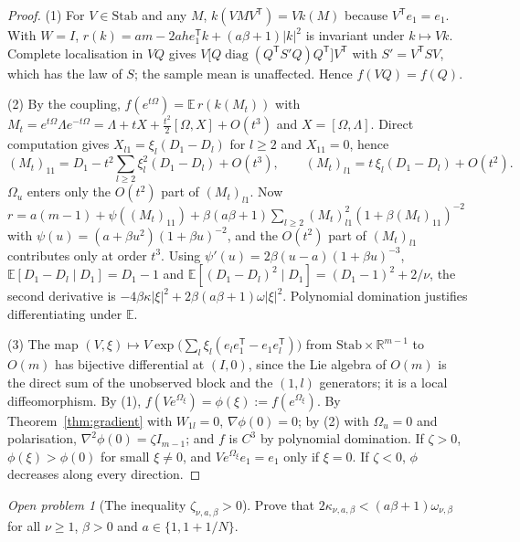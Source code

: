 \documentclass[11pt,a4paper]{article}
\numberwithin{equation}{section}
\theoremstyle{remark}\newtheorem{remark}[theorem]{Remark}
\newtheorem{openproblem}[theorem]{Open problem}
\newcommand{\E}{\mathbb E}
\newcommand{\R}{\mathbb R}
\newcommand{\diag}{\operatorname{diag}}
\newcommand{\T}{^{\mathsf T}}
\begin{document}
\begin{proof}
(1) For \(V\in\mathrm{Stab}\) and any \(M\), \(k(VMV\T)=Vk(M)\) because \(V\T e_1=e_1\). With \(W=I\),
\(r(k)=am-2ahe_1\T k+(a\beta+1)|k|^2\) is invariant under \(k\mapsto Vk\). Complete localisation in
\(VQ\) gives \(V\bigl[Q\diag(Q\T S'Q)Q\T\bigr]V\T\) with \(S'=V\T SV\), which has the law of \(S\); the
sample mean is unaffected. Hence \(f(VQ)=f(Q)\).

(2) By the coupling, \(f(e^{t\Omega})=\E\,r(k(M_t))\) with
\(M_t=e^{t\Omega}\Lambda e^{-t\Omega}=\Lambda+tX+\frac{t^2}2[\Omega,X]+O(t^3)\) and
\(X=[\Omega,\Lambda]\). Direct computation gives \(X_{l1}=\xi_l(D_1-D_l)\) for \(l\ge2\) and
\(X_{11}=0\), hence
\[
 (M_t)_{11}=D_1-t^2\sum_{l\ge2}\xi_l^2(D_1-D_l)+O(t^3),\qquad
 (M_t)_{l1}=t\,\xi_l(D_1-D_l)+O(t^2).
\]
\(\Omega_u\) enters only the \(O(t^2)\) part of \((M_t)_{l1}\). Now
\(r=a(m-1)+\psi((M_t)_{11})+\beta(a\beta+1)\sum_{l\ge2}(M_t)_{l1}^2(1+\beta(M_t)_{11})^{-2}\) with
\(\psi(u)=(a+\beta u^2)(1+\beta u)^{-2}\), and the \(O(t^2)\) part of \((M_t)_{l1}\) contributes only
at order \(t^3\). Using \(\psi'(u)=2\beta(u-a)(1+\beta u)^{-3}\), \(\E[D_1-D_l\mid D_1]=D_1-1\) and
\(\E[(D_1-D_l)^2\mid D_1]=(D_1-1)^2+2/\nu\), the second derivative is
\(-4\beta\kappa|\xi|^2+2\beta(a\beta+1)\omega|\xi|^2\). Polynomial domination justifies
differentiating under \(\E\).

(3) The map \((V,\xi)\mapsto V\exp\bigl(\sum_l\xi_l(e_le_1\T-e_1e_l\T)\bigr)\) from
\(\mathrm{Stab}\times\R^{m-1}\) to \(O(m)\) has bijective differential at \((I,0)\), since the Lie
algebra of \(O(m)\) is the direct sum of the unobserved block and the \((1,l)\) generators; it is
a local diffeomorphism. By (1), \(f(Ve^{\Omega_\xi})=\phi(\xi):=f(e^{\Omega_\xi})\). By
Theorem~\ref{thm:gradient} with \(W_{1l}=0\), \(\nabla\phi(0)=0\); by (2) with \(\Omega_u=0\) and
polarisation, \(\nabla^2\phi(0)=\zeta I_{m-1}\); and \(f\) is \(C^3\) by polynomial domination. If
\(\zeta>0\), \(\phi(\xi)>\phi(0)\) for small \(\xi\ne0\), and \(Ve^{\Omega_\xi}e_1=e_1\) only if
\(\xi=0\). If \(\zeta<0\), \(\phi\) decreases along every direction.
\end{proof}

\begin{openproblem}[The inequality \(\zeta_{\nu,a,\beta}>0\)]\label{op:WI}
Prove that \(2\kappa_{\nu,a,\beta}<(a\beta+1)\omega_{\nu,\beta}\) for all \(\nu\ge1\), \(\beta>0\) and
\(a\in\{1,1+1/N\}\).
\end{openproblem}
\end{document}
